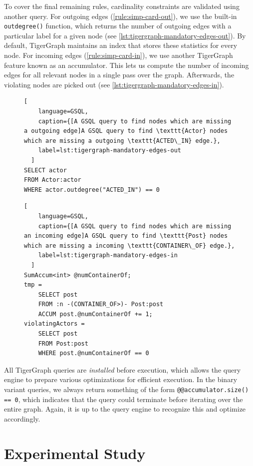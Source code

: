 \documentclass{report}
\theoremstyle{definition}
\begin{document}
To cover the final remaining rules, cardinality constraints are validated using another query. For outgoing edges (\autoref{rule:simp-card-out}), we use the built-in \texttt{outdegree()} function, which returns the number of outgoing edges with a particular label for a given node (see \autoref{lst:tigergraph-mandatory-edges-out}). By default, TigerGraph maintains an index that stores these statistics for every node. For incoming edges (\autoref{rule:simp-card-in}), we use another TigerGraph feature known as an accumulator. This lets us compute the number of incoming edges for all relevant nodes in a single pass over the graph. Afterwards, the violating nodes are picked out (see \autoref{lst:tigergraph-mandatory-edges-in}).

\begin{figure}[H]
  \begin{lstlisting}[
    language=GSQL,
    caption={[A GSQL query to find nodes which are missing a outgoing edge]A GSQL query to find \texttt{Actor} nodes which are missing a outgoing \texttt{ACTED\_IN} edge.},
    label=lst:tigergraph-mandatory-edges-out
  ]
SELECT actor
FROM Actor:actor
WHERE actor.outdegree("ACTED_IN") == 0
  \end{lstlisting}
\end{figure}
\vspace*{-8pt}
\begin{figure}[H]
  \begin{lstlisting}[
    language=GSQL,
    caption={[A GSQL query to find nodes which are missing an incoming edge]A GSQL query to find \texttt{Post} nodes which are missing a incoming \texttt{CONTAINER\_OF} edge.},
    label=lst:tigergraph-mandatory-edges-in
  ]
SumAccum<int> @numContainerOf;
tmp =
    SELECT post
    FROM :n -(CONTAINER_OF>)- Post:post
    ACCUM post.@numContainerOf += 1;
violatingActors =
    SELECT post
    FROM Post:post
    WHERE post.@numContainerOf == 0
  \end{lstlisting}
\end{figure}

All TigerGraph queries are \emph{installed} before execution, which allows the query engine to prepare various optimizations for efficient execution. In the binary variant queries, we always return something of the form \texttt{@@accumulator.size() == 0}, which indicates that the query could terminate before iterating over the entire graph. Again, it is up to the query engine to recognize this and optimize accordingly.

\chapter{Experimental Study}
\label{ch:experiment}
\end{document}
